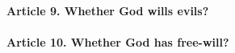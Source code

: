 \documentclass{ucetd}
\begin{document}
\paragraph{Article 9. Whether God wills evils?}
\paragraph{Article 10. Whether God has free-will?}
\end{document}
